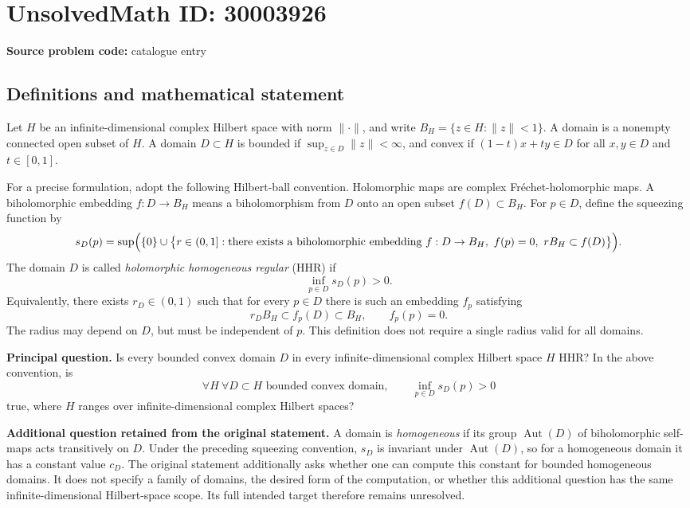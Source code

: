 \documentclass[11pt]{article}
\begin{document}
\section*{UnsolvedMath ID: 30003926}
\textbf{Source problem code:} catalogue entry
\subsection{Definitions and mathematical statement}
Let \(H\) be an infinite-dimensional complex Hilbert space with norm \(\|\cdot\|\), and write \(B_H=\{z\in H:\|z\|<1\}\). A domain is a nonempty connected open subset of \(H\). A domain \(D\subset H\) is bounded if \(\sup_{z\in D}\|z\|<\infty\), and convex if \((1-t)x+ty\in D\) for all \(x,y\in D\) and \(t\in[0,1]\).

For a precise formulation, adopt the following Hilbert-ball convention. Holomorphic maps are complex Fr\'echet-holomorphic maps. A biholomorphic embedding \(f:D\to B_H\) means a biholomorphism from \(D\) onto an open subset \(f(D)\subset B_H\). For \(p\in D\), define the squeezing function by
\[
 s_D(p)=\sup\Bigl(\{0\}\cup\bigl\{r\in(0,1]:\text{there exists a biholomorphic embedding }f:D\to B_H,
 \ f(p)=0,\ rB_H\subset f(D)\bigr\}\Bigr).
\]
The domain \(D\) is called \emph{holomorphic homogeneous regular} (HHR) if
\[
 \inf_{p\in D}s_D(p)>0.
\]
Equivalently, there exists \(r_D\in(0,1)\) such that for every \(p\in D\) there is such an embedding \(f_p\) satisfying
\[
 r_DB_H\subset f_p(D)\subset B_H,\qquad f_p(p)=0.
\]
The radius may depend on \(D\), but must be independent of \(p\). This definition does not require a single radius valid for all domains.

\textbf{Principal question.} Is every bounded convex domain \(D\) in every infinite-dimensional complex Hilbert space \(H\) HHR? In the above convention, is
\[
 \forall H\ \forall D\subset H\text{ bounded convex domain},\qquad
 \inf_{p\in D}s_D(p)>0
\]
true, where \(H\) ranges over infinite-dimensional complex Hilbert spaces?

\textbf{Additional question retained from the original statement.} A domain is \emph{homogeneous} if its group \(\operatorname{Aut}(D)\) of biholomorphic self-maps acts transitively on \(D\). Under the preceding squeezing convention, \(s_D\) is invariant under \(\operatorname{Aut}(D)\), so for a homogeneous domain it has a constant value \(c_D\). The original statement additionally asks whether one can compute this constant for bounded homogeneous domains. It does not specify a family of domains, the desired form of the computation, or whether this additional question has the same infinite-dimensional Hilbert-space scope. Its full intended target therefore remains unresolved.
\end{document}
